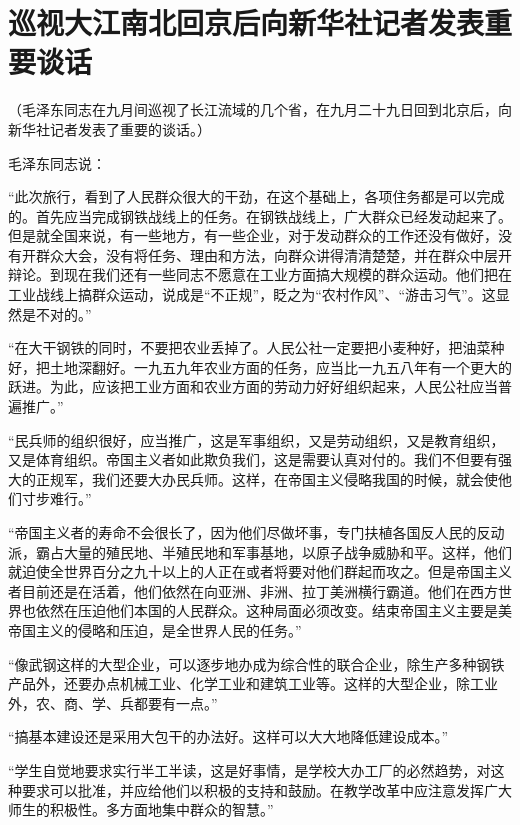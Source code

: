 \section[巡视大江南北回京后向新华社记者发表重要谈话（一九五八年九月二十九日）]{巡视大江南北回京后向新华社记者发表重要谈话}


（毛泽东同志在九月间巡视了长江流域的几个省，在九月二十九日回到北京后，向新华社记者发表了重要的谈话。）

毛泽东同志说：

“此次旅行，看到了人民群众很大的干劲，在这个基础上，各项住务都是可以完成的。首先应当完成钢铁战线上的任务。在钢铁战线上，广大群众已经发动起来了。但是就全国来说，有一些地方，有一些企业，对于发动群众的工作还没有做好，没有开群众大会，没有将任务、理由和方法，向群众讲得清清楚楚，并在群众中层开辩论。到现在我们还有一些同志不愿意在工业方面搞大规模的群众运动。他们把在工业战线上搞群众运动，说成是“不正规”，眨之为“农村作风”、“游击习气”。这显然是不对的。”

“在大干钢铁的同时，不要把农业丢掉了。人民公社一定要把小麦种好，把油菜种好，把土地深翻好。一九五九年农业方面的任务，应当比一九五八年有一个更大的跃进。为此，应该把工业方面和农业方面的劳动力好好组织起来，人民公社应当普遍推广。”

“民兵师的组织很好，应当推广，这是军事组织，又是劳动组织，又是教育组织，又是体育组织。帝国主义者如此欺负我们，这是需要认真对付的。我们不但要有强大的正规军，我们还要大办民兵师。这样，在帝国主义侵略我国的时候，就会使他们寸步难行。”

“帝国主义者的寿命不会很长了，因为他们尽做坏事，专门扶植各国反人民的反动派，霸占大量的殖民地、半殖民地和军事基地，以原子战争威胁和平。这样，他们就迫使全世界百分之九十以上的人正在或者将要对他们群起而攻之。但是帝国主义者目前还是在活着，他们依然在向亚洲、非洲、拉丁美洲横行霸道。他们在西方世界也依然在压迫他们本国的人民群众。这种局面必须改变。结束帝国主义主要是美帝国主义的侵略和压迫，是全世界人民的任务。”

“像武钢这样的大型企业，可以逐步地办成为综合性的联合企业，除生产多种钢铁产品外，还要办点机械工业、化学工业和建筑工业等。这样的大型企业，除工业外，农、商、学、兵都要有一点。”

“搞基本建设还是采用大包干的办法好。这样可以大大地降低建设成本。”

“学生自觉地要求实行半工半读，这是好事情，是学校大办工厂的必然趋势，对这种要求可以批准，并应给他们以积极的支持和鼓励。在教学改革中应注意发挥广大师生的积极性。多方面地集中群众的智慧。”


